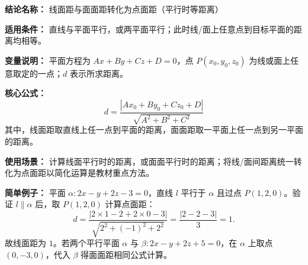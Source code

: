 \textbf{结论名称：} 线面距与面面距转化为点面距（平行时等距离）

\textbf{适用条件：} 直线与平面平行，或两平面平行；此时线/面上任意点到目标平面的距离均相等。

\textbf{变量说明：} 平面方程为 \(Ax+By+Cz+D=0\)，点 \(P(x_0,y_0,z_0)\) 为线或面上任意取定的一点；\(d\) 表示所求距离。

\textbf{核心公式：}
\[
\boxed{d = \frac{|Ax_0 + By_0 + Cz_0 + D|}{\sqrt{A^2 + B^2 + C^2}}}
\]
其中，线面距取直线上任一点到平面的距离，面面距取一平面上任一点到另一平面的距离。

\textbf{使用场景：} 计算线面平行时的距离，或面面平行时的距离；将线/面间距离统一转化为点面距以简化运算是教材重点方法。

\textbf{简单例子：} 平面 \(\alpha: 2x - y + 2z - 3 = 0\)，直线 \(l\) 平行于 \(\alpha\) 且过点 \(P(1,2,0)\)。验证 \(l\parallel\alpha\) 后，取 \(P(1,2,0)\) 计算点面距：
\[
d = \frac{|2\times1 - 2 + 2\times0 - 3|}{\sqrt{2^2+(-1)^2+2^2}}
  = \frac{|2 - 2 - 3|}{3} = 1.
\]
故线面距为 \(1\)。若两个平行平面 \(\alpha\) 与 \(\beta: 2x - y + 2z + 5 = 0\)，在 \(\alpha\) 上取点 \((0, -3, 0)\)，代入 \(\beta\) 得面面距相同公式计算。